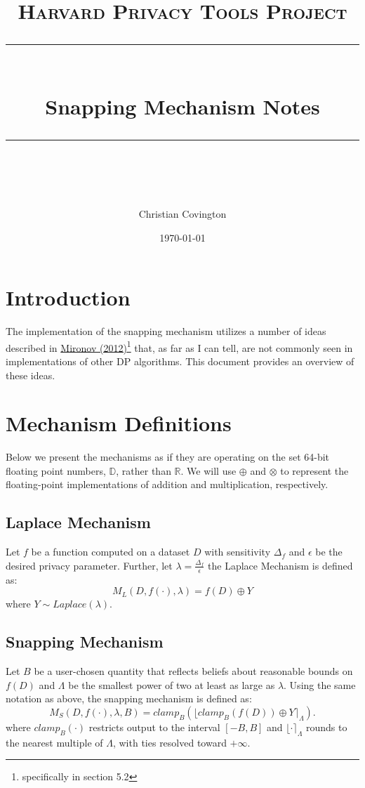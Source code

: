 \documentclass[11pt]{scrartcl} %
\title{
	\normalfont\normalsize
	\textsc{Harvard Privacy Tools Project}\\ %
	\vspace{25pt} %
	\rule{\linewidth}{0.5pt}\\ %
	\vspace{20pt} %
	{\huge Snapping Mechanism Notes}\\ %
	\vspace{12pt} %
	\rule{\linewidth}{2pt}\\ %
	\vspace{12pt} %
}
\author{\LARGE Christian Covington} %
\date{\normalsize\today} %
\begin{document}
\maketitle %

\section{Introduction}
The implementation of the snapping mechanism utilizes a number of ideas described in \href{http://citeseerx.ist.psu.edu/viewdoc/download?doi=10.1.1.366.5957&rep=rep1&type=pdf}{Mironov (2012)}\footnote{specifically in section 5.2} that, as far as I can tell, are not commonly seen in implementations of other DP algorithms. This document provides an overview of these ideas. \newline

\section{Mechanism Definitions}
Below we present the mechanisms as if they are operating on the set 64-bit floating point numbers, $\mathbb{D}$, rather than $\mathbb{R}$. We will use $\oplus$ and $\otimes$ to represent the floating-point implementations of addition and multiplication, respectively.

\subsection{Laplace Mechanism}
Let $f$ be a function computed on a dataset $D$ with sensitivity $\Delta_f$ and $\epsilon$ be the desired privacy parameter. Further, let $\lambda = \frac{\Delta_f}{\epsilon}$ the Laplace Mechanism is defined as:
\[ M_{L}(D, f(\cdot), \lambda) = f(D) \oplus Y \]
where $Y \sim Laplace(\lambda)$.

\subsection{Snapping Mechanism}
Let $B$ be a user-chosen quantity that reflects beliefs about reasonable bounds on $f(D)$ and $\Lambda$ be the smallest power of two at least as large as $\lambda$. Using the same notation as above, the snapping mechanism is defined as:
\[ M_{S}(D, f(\cdot), \lambda, B) = clamp_{B}\left( \lfloor clamp_{B}\left( f(D) \right) \oplus Y \rceil_{\Lambda} \right). \]
where $clamp_{B}(\cdot)$ restricts output to the interval $[-B, B]$ and $\lfloor \cdot \rceil_{\Lambda}$ rounds to the nearest multiple of $\Lambda$, with ties resolved toward $+ \infty$.
\end{document}
